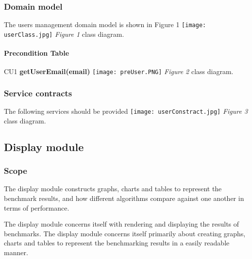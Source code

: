 \documentclass[runningheads,a4paper]{article}
\begin{document}
\subsubsection{\textbf{Domain model}}\newline
The users management domain model is shown in Figure 1
\newline
\newline
\texttt{[image: userClass.jpg]}
\newline 
\textit{Figure 1} class diagram.

\paragraph{\textbf{Precondition Table}}\newline
CU1 \textbf{getUserEmail(email)}
\newline
\newline
\texttt{[image: preUser.PNG]}
\newline 
\textit{Figure 2} class diagram.

\subsubsection{\textbf{Service contracts}}\newline
The following services should be provided
\newline
\newline
\texttt{[image: userConstract.jpg]}
\newline 
\textit{Figure 3} class diagram.

\subsection{Display module}
\subsubsection{\textbf{Scope}}\newline
The display module constructs graphs, charts and tables to represent the benchmark results, and how different algorithms 
compare against one another in terms of performance.

\newline
The display module concerns itself with rendering and displaying the results of benchmarks.
The display module concerns itself primarily about creating graphs, charts and tables to represent the
benchmarking results in a easily readable manner. 
\newline
\end{document}
